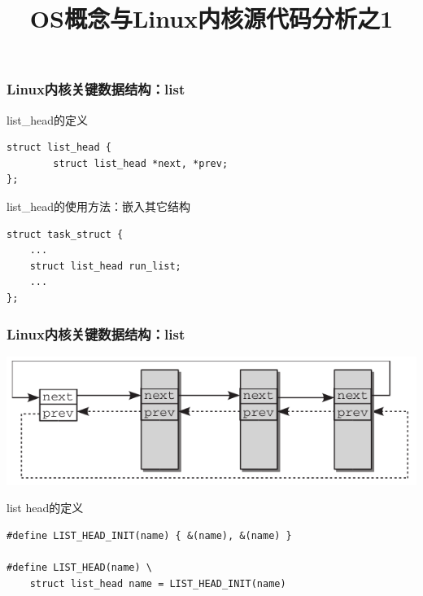 \documentclass[xcolor=svgnames]{beamer}
\begin{document}
\begin{CJK*}{UTF8}{gbsn}


\title{OS概念与Linux内核源代码分析之1}

\begin{frame}
\maketitle
\end{frame}


\begin{frame}[fragile]%
\frametitle{Linux内核关键数据结构：list}
\begin{block}{list\_head的定义}
\begin{verbatim}
struct list_head {
        struct list_head *next, *prev;
};
\end{verbatim}
\end{block}

\begin{block}{list\_head的使用方法：嵌入其它结构}
\begin{verbatim}
struct task_struct {
    ...
    struct list_head run_list;
    ...
};
\end{verbatim}
\end{block}

\end{frame}


\begin{frame}[fragile]
\frametitle{Linux内核关键数据结构：list}
\includegraphics[width=1.0\textwidth]{list.png}
\begin{block}{list head的定义}
\begin{verbatim}
#define LIST_HEAD_INIT(name) { &(name), &(name) }

#define LIST_HEAD(name) \
    struct list_head name = LIST_HEAD_INIT(name)
\end{verbatim}
\end{block}
\end{frame}


\end{CJK*}
\end{document}
